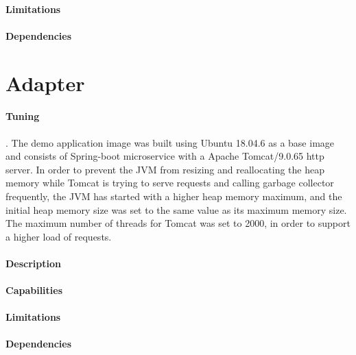 \paragraph{Limitations}
\paragraph{Dependencies}

\section{Adapter} %
\label{sec:adapter}

\paragraph{Tuning}. The demo application image was built using Ubuntu 18.04.6 as a base image and consists of Spring-boot microservice with a Apache Tomcat/9.0.65 http server.
In order to prevent the JVM from resizing and reallocating the heap memory while Tomcat is trying to serve requests and
calling garbage collector frequently, the JVM has started with a higher heap memory maximum, and the initial heap memory
size was set to the same value as its maximum memory size.
The maximum number of threads for Tomcat was set to 2000, in order to support a higher load of requests.

\paragraph{Description}
\paragraph{Capabilities}
\paragraph{Limitations}
\paragraph{Dependencies}

